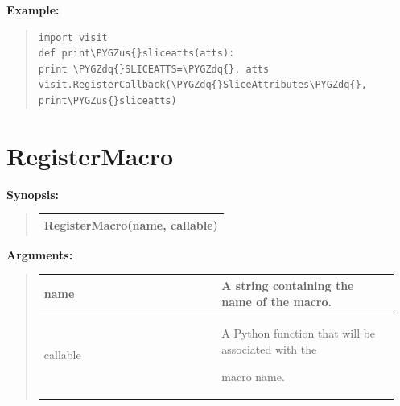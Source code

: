 \documentclass[letterpaper,10pt,english]{sphinxmanual}
\def\PYGZus{\char`\_}
\def\PYGZdq{\char`\"}
\begin{document}
\begin{DUlineblock}{0em}
\item[] 
\end{DUlineblock}

\begin{DUlineblock}{0em}
\item[] \textbf{Example:}
\item[] 
\end{DUlineblock}
\begin{quote}

\begin{Verbatim}[commandchars=\\\{\}]
import visit
def print\PYGZus{}sliceatts(atts):
print \PYGZdq{}SLICEATTS=\PYGZdq{}, atts
visit.RegisterCallback(\PYGZdq{}SliceAttributes\PYGZdq{}, print\PYGZus{}sliceatts)
\end{Verbatim}
\end{quote}


\section{RegisterMacro}
\label{functions:registermacro}
\begin{DUlineblock}{0em}
\item[] \textbf{Synopsis:}
\end{DUlineblock}
\begin{quote}

\begin{tabulary}{\linewidth}{|L|}
\hline

RegisterMacro(name, callable)
\\
\hline\end{tabulary}

\end{quote}

\begin{DUlineblock}{0em}
\item[] 
\item[] \textbf{Arguments:}
\end{DUlineblock}
\begin{quote}

\begin{tabular}{|p{0.475\linewidth}|p{0.475\linewidth}|}
\hline

name
 & 
A string containing the name of the macro.
\\
\hline
callable
 & 
\begin{DUlineblock}{0em}
\item[] A Python function that will be associated with the
\item[] macro name.
\end{DUlineblock}
\\
\hline\end{tabular}

\end{quote}
\end{document}
